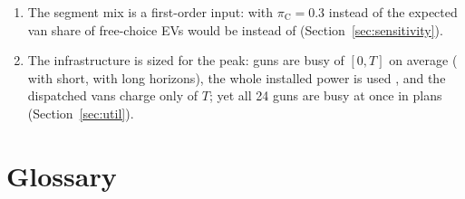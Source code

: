 \begin{keyboxb}
\begin{enumerate}[leftmargin=1.4em,itemsep=1pt]
  \item The segment mix is a first-order input: with $\pi_{\mathrm C}=0.3$ instead of \PiC{} the expected van share of free-choice EVs would be \ExpVanPiThree\pct{} instead of \ExpVanPiSeven\pct{} (Section~\ref{sec:sensitivity}).
  \item The infrastructure is sized for the peak: guns are busy \UGunMean\pct{} of $[0,T]$ on average (\UGunShort\pct{} with short, \UGunLong\pct{} with long horizons), the whole installed power is used \USystemMean\pct, and the dispatched vans charge only \UChargeMean\pct{} of $T$; yet all 24 guns are busy at once in \UPeakGunsFull{} plans (Section~\ref{sec:util}).
\end{enumerate}
\end{keyboxb}

\tableofcontents
\newpage

\section{Glossary}
\label{sec:glossary}

